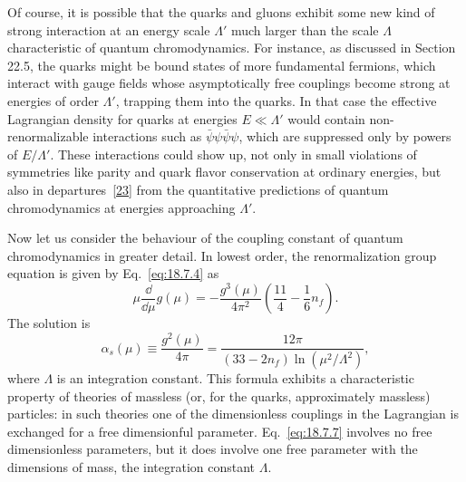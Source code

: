 Of course, it is possible that the quarks and gluons exhibit some new kind of strong interaction at an energy scale $\Lambda'$ much larger than the scale $\Lambda$ characteristic of quantum chromodynamics. For instance, as discussed in Section 22.5, the quarks might be bound states of more fundamental fermions, which interact with gauge fields whose asymptotically free couplings become strong at energies of order $\Lambda'$, trapping them into the quarks. In that case the effective Lagrangian density for quarks at energies $E\ll\Lambda'$ would contain non-renormalizable interactions such as $\bar\psi\psi\bar\psi\psi$, which are suppressed only by powers of $E/\Lambda'$. These interactions could show up, not only in small violations of symmetries like parity and quark flavor conservation at ordinary energies, but also in departures~\hyperref[ch18-ref-23]{[23]} from the quantitative predictions of quantum chromodynamics at energies approaching $\Lambda'$.

Now let us consider the behaviour of the coupling constant of quantum chromodynamics in greater detail. In lowest order, the renormalization group equation is given by Eq.~\eqref{eq:18.7.4} as
\begin{equation}
\mu\frac{\dd}{\dd\mu}g(\mu)=-\frac{g^3(\mu)}{4\pi^2}\left(\frac{11}{4}-\frac{1}{6}n_f\right).
\tag{18.7.6}\label{eq:18.7.6}
\end{equation}
The solution is
\begin{equation}
\alpha_s(\mu)\equiv\frac{g^2(\mu)}{4\pi}
=\frac{12\pi}{(33-2n_f)\ln(\mu^2/\Lambda^2)},
\tag{18.7.7}\label{eq:18.7.7}
\end{equation}
where $\Lambda$ is an integration constant. This formula exhibits a characteristic property of theories of massless (or, for the quarks, approximately massless) particles: in such theories one of the dimensionless couplings in the Lagrangian is exchanged for a free dimensionful parameter. Eq.~\eqref{eq:18.7.7} involves no free dimensionless parameters, but it does involve one free parameter with the dimensions of mass, the integration constant $\Lambda$.


